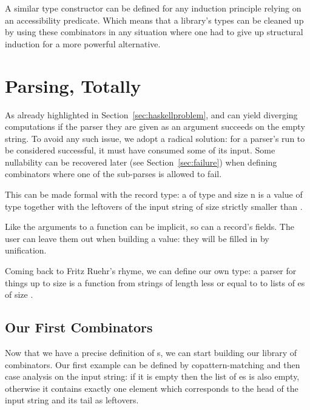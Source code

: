   A similar \BOX{}
type constructor can be defined for any induction principle relying
on an accessibility predicate. Which means that a library's types
can be cleaned up by using these combinators in any situation where
one had to give up structural induction for a more powerful alternative.

\section{Parsing, Totally}

As already highlighted in Section~\ref{sec:haskellproblem}, 
and  can yield diverging computations if the parser they are
given as an argument succeeds on the empty string. To avoid any such
issue, we adopt a radical solution: for a parser's run to be considered
successful, it must have consumed some of its input. Some nullability
can be recovered later (see Section~\ref{sec:failure}) when defining
combinators where one of the sub-parses is allowed to fail.

This can be made formal with the  record type: a 
of type  and size {n} is a value of type  together with the
leftovers of the input string of size strictly smaller than .


 Like the arguments to a function can be implicit,
so can a record's fields. The user can leave them out when building a
value: they will be filled in by unification.
\medskip{}

Coming back to Fritz Ruehr's rhyme, we can define our own 
type: a parser for things up to size  is a function from strings
of length  less or equal to  to lists of es of size .


\subsection{Our First Combinators}

Now that we have a precise definition of s, we can start
building our library of combinators. Our first example 
can be defined by copattern-matching and then case analysis on the
input string: if it is empty then the list of es is also
empty, otherwise it contains exactly one element which corresponds to
the head of the input string and its tail as leftovers.

